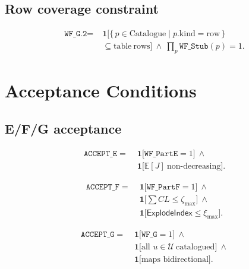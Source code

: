 \documentclass[conference]{IEEEtran}
\begin{document}
\subsection{Row coverage constraint}
\begin{equation}
\label{eq:wf-g2}
\begin{aligned}
\texttt{WF\_G.2}=\;&
\mathbf{1}\Big[\{\,p\in\mathrm{Catalogue}\mid p.\mathrm{kind}=\mathrm{row}\,\}\\[-2pt]
&\subseteq\mathrm{table\ rows}\Big]\ \wedge\ \prod_{p}\texttt{WF\_Stub}(p)=1.
\end{aligned}
\end{equation}

\section{Acceptance Conditions}
\subsection{E/F/G acceptance}
\begin{equation}
\label{eq:accept-e}
\begin{aligned}
\mathtt{ACCEPT\_E}=\;&\mathbf{1}\big[\mathtt{WF\_PartE}=1\big]\ \wedge\\[-2pt]
&\mathbf{1}\big[\mathbb{E}[J]\ \text{non-decreasing}\big].
\end{aligned}
\end{equation}

\begin{equation}
\label{eq:accept-f}
\begin{aligned}
\mathtt{ACCEPT\_F}=\;&\mathbf{1}\big[\mathtt{WF\_PartF}=1\big]\ \wedge\\[-2pt]
&\mathbf{1}\big[{\textstyle\sum} CL\le \zeta_{\max}\big]\ \wedge\\[-2pt]
&\mathbf{1}\big[\mathsf{ExplodeIndex}\le \xi_{\max}\big].
\end{aligned}
\end{equation}

\begin{equation}
\label{eq:accept-g}
\begin{aligned}
\mathtt{ACCEPT\_G}=\;&\mathbf{1}\big[\mathtt{WF\_G}=1\big]\ \wedge\\[-2pt]
&\mathbf{1}\big[\text{all }u\in\mathcal{U}\ \text{catalogued}\big]\ \wedge\\[-2pt]
&\mathbf{1}\big[\text{maps bidirectional}\big].
\end{aligned}
\end{equation}
\end{document}
